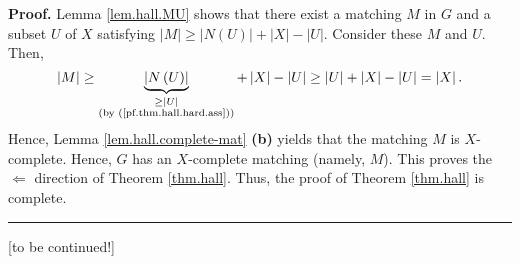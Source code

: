 \documentclass[numbers=enddot,12pt,final,onecolumn,notitlepage]{scrartcl}%
\theoremstyle{definition}
\newenvironment{proof}[1][Proof]{\noindent\textbf{#1.} }{\ \rule{0.5em}{0.5em}}
\begin{document}
\begin{proof}
Lemma \ref{lem.hall.MU} shows that there exist a matching $M$ in $G$ and a
subset $U$ of $X$ satisfying $\left\vert M\right\vert \geq\left\vert N\left(
U\right)  \right\vert +\left\vert X\right\vert -\left\vert U\right\vert $.
Consider these $M$ and $U$. Then,%
\[
\left\vert M\right\vert \geq\underbrace{\left\vert N\left(  U\right)
\right\vert }_{\substack{\geq\left\vert U\right\vert \\\text{(by
(\ref{pf.thm.hall.hard.ass}))}}}+\left\vert X\right\vert -\left\vert
U\right\vert \geq\left\vert U\right\vert +\left\vert X\right\vert -\left\vert
U\right\vert =\left\vert X\right\vert .
\]
Hence, Lemma \ref{lem.hall.complete-mat} \textbf{(b)} yields that the matching
$M$ is $X$-complete. Hence, $G$ has an $X$-complete matching (namely, $M$).
This proves the $\Longleftarrow$ direction of Theorem \ref{thm.hall}. Thus,
the proof of Theorem \ref{thm.hall} is complete.
\end{proof}

[to be continued!]
\end{document}
